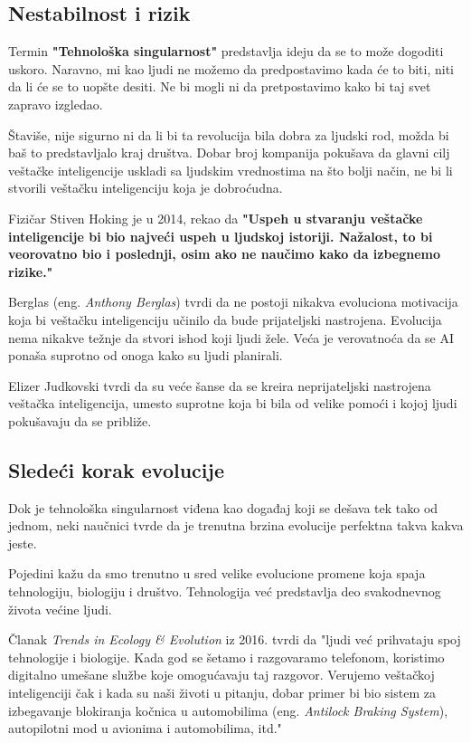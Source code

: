 \documentclass[a4paper]{article}
\begin{document}
\subsection{Nestabilnost i rizik}
\label{subsec:nestabilnost_i_rizik}
\hfill

Termin \textbf{"Tehnološka singularnost"} predstavlja ideju da se to može dogoditi uskoro. Naravno, mi kao ljudi ne možemo da predpostavimo kada će to biti, niti da li će se to uopšte desiti. Ne bi mogli ni da pretpostavimo kako bi taj svet zapravo izgledao. 

Štaviše, nije sigurno ni da li bi ta revolucija bila dobra za ljudski rod, možda bi baš to predstavljalo kraj društva. Dobar broj kompanija pokušava da glavni cilj veštačke inteligencije uskladi sa ljudskim vrednostima na što bolji način, ne bi li stvorili veštačku inteligenciju koja je dobroćudna.

Fizičar Stiven Hoking je u 2014, rekao da \textbf{"Uspeh u stvaranju veštačke inteligencije bi bio najveći uspeh u ljudskoj istoriji. Nažalost, to bi veorovatno bio i poslednji, osim ako ne naučimo kako da izbegnemo rizike."}\cite{r2}

Berglas (eng. \textit{Anthony Berglas}) tvrdi da ne postoji nikakva evoluciona motivacija koja bi veštačku inteligenciju učinilo da bude prijateljski nastrojena. Evolucija nema nikakve težnje da stvori ishod koji ljudi žele. Veća je verovatnoća da se AI ponaša suprotno od onoga kako su ljudi planirali.

Elizer Judkovski tvrdi da su veće šanse da se kreira neprijateljski nastrojena veštačka inteligencija, umesto suprotne koja bi bila od velike pomoći i kojoj ljudi pokušavaju da se približe.

\subsection{Sledeći korak evolucije}
\label{subsec:sledeći_korak_evolucije}
\hfill

Dok je tehnološka singularnost viđena kao događaj koji se dešava tek tako od jednom, neki naučnici tvrde da je trenutna brzina evolucije perfektna takva kakva jeste.

Pojedini kažu da smo trenutno u sred velike evolucione promene koja spaja tehnologiju, biologiju i društvo. Tehnologija već predstavlja deo svakodnevnog života većine ljudi.

Članak \textit{Trends in Ecology \& Evolution}\cite{r3} iz 2016. tvrdi da "ljudi već prihvataju spoj tehnologije i biologije. Kada god se šetamo i razgovaramo telefonom, koristimo digitalno umešane službe koje omogućavaju taj razgovor. Verujemo veštačkoj inteligenciji čak i kada su naši životi u pitanju, dobar primer bi bio sistem za izbegavanje blokiranja kočnica u automobilima (eng. \textit{Antilock Braking System}), autopilotni mod u avionima i automobilima, itd."
\end{document}
